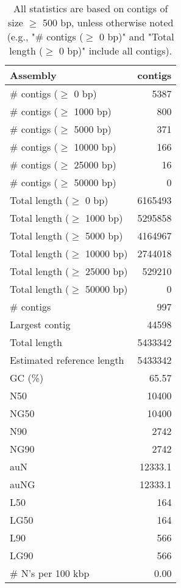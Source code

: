 \documentclass[12pt,a4paper]{article}
\begin{document}
\begin{table}[ht]
\begin{center}
\caption{All statistics are based on contigs of size $\geq$ 500 bp, unless otherwise noted (e.g., "\# contigs ($\geq$ 0 bp)" and "Total length ($\geq$ 0 bp)" include all contigs).}
\begin{tabular}{|l*{1}{|r}|}
\hline
Assembly & contigs \\ \hline
\# contigs ($\geq$ 0 bp) & 5387 \\ \hline
\# contigs ($\geq$ 1000 bp) & 800 \\ \hline
\# contigs ($\geq$ 5000 bp) & 371 \\ \hline
\# contigs ($\geq$ 10000 bp) & 166 \\ \hline
\# contigs ($\geq$ 25000 bp) & 16 \\ \hline
\# contigs ($\geq$ 50000 bp) & 0 \\ \hline
Total length ($\geq$ 0 bp) & 6165493 \\ \hline
Total length ($\geq$ 1000 bp) & 5295858 \\ \hline
Total length ($\geq$ 5000 bp) & 4164967 \\ \hline
Total length ($\geq$ 10000 bp) & 2744018 \\ \hline
Total length ($\geq$ 25000 bp) & 529210 \\ \hline
Total length ($\geq$ 50000 bp) & 0 \\ \hline
\# contigs & 997 \\ \hline
Largest contig & 44598 \\ \hline
Total length & 5433342 \\ \hline
Estimated reference length & 5433342 \\ \hline
GC (\%) & 65.57 \\ \hline
N50 & 10400 \\ \hline
NG50 & 10400 \\ \hline
N90 & 2742 \\ \hline
NG90 & 2742 \\ \hline
auN & 12333.1 \\ \hline
auNG & 12333.1 \\ \hline
L50 & 164 \\ \hline
LG50 & 164 \\ \hline
L90 & 566 \\ \hline
LG90 & 566 \\ \hline
\# N's per 100 kbp & 0.00 \\ \hline
\end{tabular}
\end{center}
\end{table}
\end{document}
